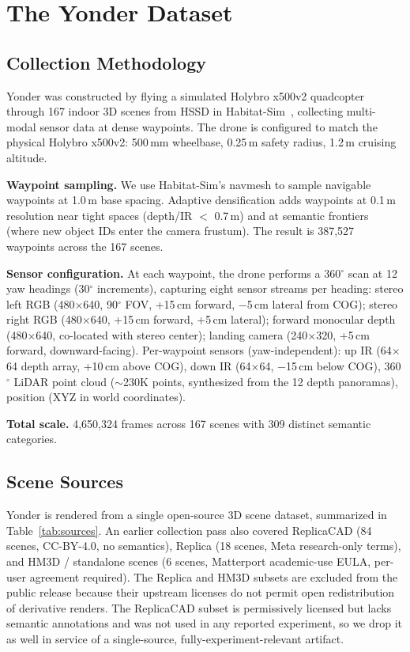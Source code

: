 \documentclass{article}
\begin{document}
\section{The Yonder Dataset}

\subsection{Collection Methodology}

Yonder was constructed by flying a simulated Holybro x500v2 quadcopter through 167 indoor 3D scenes from HSSD in Habitat-Sim~\cite{savva2019habitat}, collecting multi-modal sensor data at dense waypoints. The drone is configured to match the physical Holybro x500v2: 500\,mm wheelbase, 0.25\,m safety radius, 1.2\,m cruising altitude.

\textbf{Waypoint sampling.} We use Habitat-Sim's navmesh to sample navigable waypoints at 1.0\,m base spacing. Adaptive densification adds waypoints at 0.1\,m resolution near tight spaces (depth/IR $<$ 0.7\,m) and at semantic frontiers (where new object IDs enter the camera frustum). The result is 387,527 waypoints across the 167 scenes.

\textbf{Sensor configuration.} At each waypoint, the drone performs a 360$^{\circ}$ scan at 12 yaw headings (30$^{\circ}$ increments), capturing eight sensor streams per heading: stereo left RGB (480$\times$640, 90$^{\circ}$ FOV, +15\,cm forward, $-$5\,cm lateral from COG); stereo right RGB (480$\times$640, +15\,cm forward, +5\,cm lateral); forward monocular depth (480$\times$640, co-located with stereo center); landing camera (240$\times$320, +5\,cm forward, downward-facing). Per-waypoint sensors (yaw-independent): up IR (64$\times$64 depth array, +10\,cm above COG), down IR (64$\times$64, $-$15\,cm below COG), 360$^{\circ}$ LiDAR point cloud ($\sim$230K points, synthesized from the 12 depth panoramas), position (XYZ in world coordinates).

\textbf{Total scale.} 4,650,324 frames across 167 scenes with 309 distinct semantic categories.

\subsection{Scene Sources}

Yonder is rendered from a single open-source 3D scene dataset, summarized in Table~\ref{tab:sources}. An earlier collection pass also covered ReplicaCAD (84 scenes, CC-BY-4.0, no semantics), Replica (18 scenes, Meta research-only terms), and HM3D / standalone scenes (6 scenes, Matterport academic-use EULA, per-user agreement required). The Replica and HM3D subsets are excluded from the public release because their upstream licenses do not permit open redistribution of derivative renders. The ReplicaCAD subset is permissively licensed but lacks semantic annotations and was not used in any reported experiment, so we drop it as well in service of a single-source, fully-experiment-relevant artifact.
\end{document}
